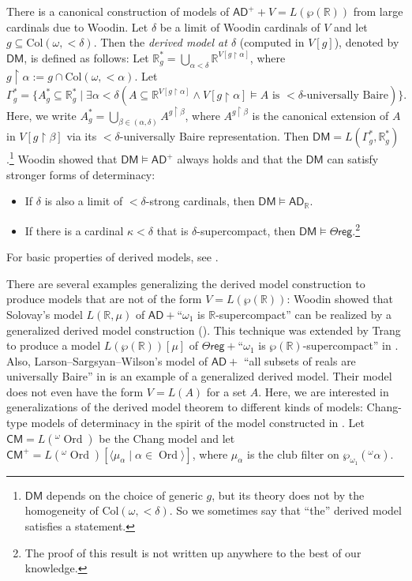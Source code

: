 \documentclass{amsart}
\renewcommand{\subset}{\subseteq}
\newcommand{\power}{\wp}
\newcommand{\uphar}{\mathbin{\upharpoonright}}
\DeclareMathOperator{\ord}{Ord}
\begin{document}
There is a canonical construction of models of $\mathsf{AD}^+ + V=L(\power(\mathbb{R}))$ from large cardinals due to Woodin.
Let $\delta$ be a limit of Woodin cardinals of $V$ and let $g\subset\mathrm{Col}(\omega, {<}\delta)$.
Then the \emph{derived model at $\delta$} (computed in $V[g]$), denoted by $\mathsf{DM}$, is defined as follows:
Let $\mathbb{R}^*_g = \bigcup_{\alpha<\delta} \mathbb{R}^{V[g\uphar\alpha]}$, where $g\uphar\alpha:=g\cap\mathrm{Col}(\omega, {<}\alpha)$.
Let
\[
\Gamma^*_g = \{A^*_g\subset\mathbb{R}^*_g\mid\exists\alpha<\delta( A\subset\mathbb{R}^{V[g\uphar\alpha]}\land V[g\uphar\alpha]\models\text{$A$ is ${<}\delta$-universally Baire})\}.
\]
Here, we write $A^*_g = \bigcup_{\beta\in(\alpha, \delta)} A^{g\uphar\beta}$, where $A^{g\uphar\beta}$ is the canonical extension of $A$ in $V[g\uphar\beta]$ via its ${<}\delta$-universally Baire representation.
Then $\mathsf{DM}=L(\Gamma^*_g, \mathbb{R}^*_g)$.\footnote{$\mathsf{DM}$ depends on the choice of generic $g$, but its theory does not by the homogeneity of $\mathrm{Col}(\omega, {<}\delta)$. So we sometimes say that ``the'' derived model satisfies a statement.}
Woodin showed that $\mathsf{DM}\models\mathsf{AD}^+$ always holds and that the $\mathsf{DM}$ can satisfy stronger forms of determinacy:
\begin{itemize}
    \item If $\delta$ is also a limit of ${<}\delta$-strong cardinals, then $\mathsf{DM}\models\mathsf{AD}_{\mathbb{R}}$.
    \item If there is a cardinal $\kappa<\delta$ that is $\delta$-supercompact, then $\mathsf{DM}\models\Theta\mathsf{reg}$.\footnote{The proof of this result is not written up anywhere to the best of our knowledge.}
\end{itemize}
For basic properties of derived models, see \cite{St09}.

There are several examples generalizing the derived model construction to produce models that are not of the form $V=L(\power(\mathbb{R}))$:
Woodin showed that Solovay's model $L(\mathbb{R}, \mu)$ of $\mathsf{AD}+$``$\omega_1$ is $\mathbb{R}$-supercompact'' can be realized by a generalized derived model construction (\cite{Tr15}).
This technique was extended by Trang to produce a model $L(\power(\mathbb{R}))[\mu]$ of $\Theta\mathsf{reg}+$``$\omega_1$ is $\power(\mathbb{R})$-supercompact'' in \cite{Tr15MALQ}.
Also, Larson--Sargsyan--Wilson's model of $\mathsf{AD}+$ ``all subsets of reals are universally Baire'' in \cite{LSW} is an example of a generalized derived model. Their model does not even have the form $V=L(A)$ for a set $A$.
Here, we are interested in generalizations of the derived model theorem to different kinds of models: Chang-type models of determinacy in the spirit of the model constructed in \cite{CoveringChang}.
Let $\mathsf{CM}=L({}^{\omega}\!\ord)$ be the Chang model and let $\mathsf{CM}^+ = L({}^{\omega}\!\ord)[\langle\mu_{\alpha}\mid\alpha\in\ord\rangle]$, where $\mu_{\alpha}$ is the club filter on $\power_{\omega_1}({}^{\omega}\alpha)$.
\end{document}
